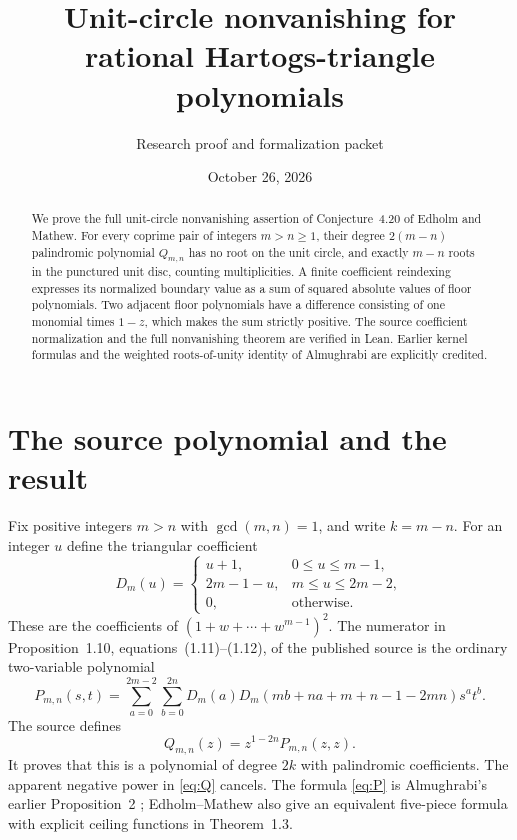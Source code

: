 \documentclass[11pt]{article}
\title{Unit-circle nonvanishing for rational Hartogs-triangle polynomials}
\author{Research proof and formalization packet}
\date{October 26, 2026}
\begin{document}
\maketitle
\begin{abstract}
We prove the full unit-circle nonvanishing assertion of Conjecture~4.20
of Edholm and Mathew. For every coprime pair of integers $m>n\geq1$,
their degree $2(m-n)$ palindromic polynomial $Q_{m,n}$ has no root on
the unit circle, and exactly $m-n$ roots in the punctured unit disc,
counting multiplicities. A finite coefficient reindexing expresses its
normalized boundary value as a sum of squared absolute values of floor
polynomials. Two adjacent floor polynomials have a difference consisting
of one monomial times $1-z$, which makes the sum strictly positive.
The source coefficient normalization and the full nonvanishing theorem
are verified in Lean. Earlier kernel formulas and the weighted
roots-of-unity identity of Almughrabi are explicitly credited.
\end{abstract}

\section{The source polynomial and the result}
Fix positive integers $m>n$ with $\gcd(m,n)=1$, and write $k=m-n$.
For an integer $u$ define the triangular coefficient
\begin{equation}\label{eq:D}
 D_m(u)=
 \begin{cases}
 u+1,&0\leq u\leq m-1,\\
 2m-1-u,&m\leq u\leq2m-2,\\
 0,&\text{otherwise}.
 \end{cases}
\end{equation}
These are the coefficients of $(1+w+\cdots+w^{m-1})^2$.
The numerator in Proposition~1.10, equations~(1.11)--(1.12), of the
published source \cite{EM} is the ordinary two-variable polynomial
\begin{equation}\label{eq:P}
 P_{m,n}(s,t)=\sum_{a=0}^{2m-2}\sum_{b=0}^{2n}
 D_m(a)D_m(mb+na+m+n-1-2mn)s^a t^b.
\end{equation}
The source defines
\begin{equation}\label{eq:Q}
 Q_{m,n}(z)=z^{1-2n}P_{m,n}(z,z).
\end{equation}
It proves that this is a polynomial of degree $2k$ with palindromic
coefficients. The apparent negative power in \eqref{eq:Q} cancels.
The formula \eqref{eq:P} is Almughrabi's earlier Proposition~2
\cite{Alm}; Edholm--Mathew also give an equivalent five-piece formula
with explicit ceiling functions in Theorem~1.3.
\end{document}

